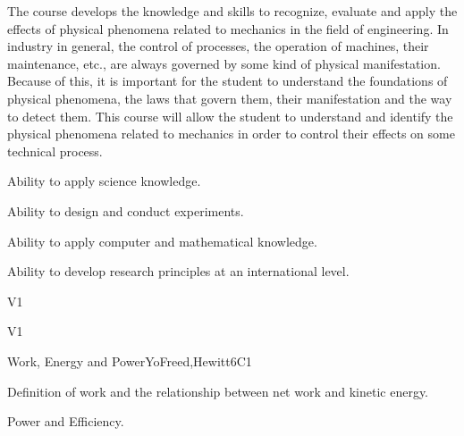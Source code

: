 \begin{syllabus}


\begin{justification}
   The course develops the knowledge and skills to recognize, evaluate and apply the effects of physical phenomena related to mechanics in the field of engineering. In industry in general, the control of processes, the operation of machines, their maintenance, etc., are always governed by some kind of physical manifestation. Because of this, it is important for the student to understand the foundations of physical phenomena, the laws that govern them, their manifestation and the way to detect them. This course will allow the student to understand and identify the physical phenomena related to mechanics in order to control their effects on some technical process. 
\end{justification}

\begin{goals}
\item Ability to apply science knowledge.
\item Ability to design and conduct experiments.
\item Ability to apply computer and mathematical knowledge.
\item Ability to develop research principles at an international level.
\end{goals}

\begin{outcomes}{V1}
  \item {}
  \item {}
  \item {}
\end{outcomes}

\begin{competences}{V1}
  \item {} 
  \item {}
  \item {}
\end{competences}

\begin{unit}{Work, Energy and Power}{}{YoFreed,Hewitt}{6}{C1}
   \begin{topics}
         \item Definition of work and the relationship between net work and kinetic energy.
         \item Power and Efficiency.
      \end{topics}
   

\end{unit}
\end{syllabus}
